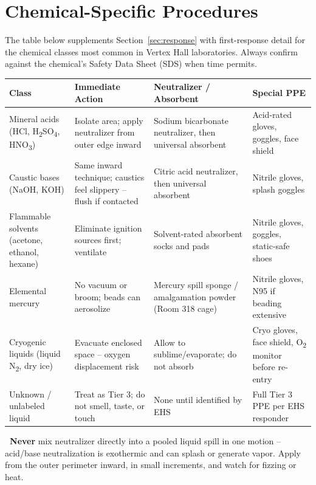 
\section{Chemical-Specific Procedures}

The table below supplements Section~\ref{sec:response} with first-response detail for the
chemical classes most common in Vertex Hall laboratories. Always confirm against the
chemical's Safety Data Sheet (SDS) when time permits.

\small
\renewcommand{\arraystretch}{1.15}
\begin{tabularx}{\linewidth}{@{}p{2.05cm} X X p{2.05cm}@{}}
\toprule
\textbf{Class} & \textbf{Immediate Action} & \textbf{Neutralizer / Absorbent} & \textbf{Special PPE}\\
\midrule
Mineral acids (HCl, H\textsubscript{2}SO\textsubscript{4}, HNO\textsubscript{3}) &
Isolate area; apply neutralizer from outer edge inward &
Sodium bicarbonate neutralizer, then universal absorbent &
Acid-rated gloves, goggles, face shield\\
Caustic bases (NaOH, KOH) &
Same inward technique; caustics feel slippery -- flush if contacted &
Citric acid neutralizer, then universal absorbent &
Nitrile gloves, splash goggles\\
Flammable solvents (acetone, ethanol, hexane) &
Eliminate ignition sources first; ventilate &
Solvent-rated absorbent socks and pads &
Nitrile gloves, goggles, static-safe shoes\\
Elemental mercury &
No vacuum or broom; beads can aerosolize &
Mercury spill sponge / amalgamation powder (Room 318 cage) &
Nitrile gloves, N95 if beading extensive\\
Cryogenic liquids (liquid N\textsubscript{2}, dry ice) &
Evacuate enclosed space -- oxygen displacement risk &
Allow to sublime/evaporate; do not absorb &
Cryo gloves, face shield, O\textsubscript{2} monitor before re-entry\\
Unknown / unlabeled liquid &
Treat as Tier 3; do not smell, taste, or touch &
None until identified by EHS &
Full Tier 3 PPE per EHS responder\\
\bottomrule
\end{tabularx}
\normalsize

\begin{emergencybox}
\textbf{\hazicon{\faExclamationTriangle}\ Never} mix neutralizer directly into a pooled liquid
spill in one motion -- acid/base neutralization is exothermic and can splash or generate vapor.
Apply from the outer perimeter inward, in small increments, and watch for fizzing or heat.
\end{emergencybox}

